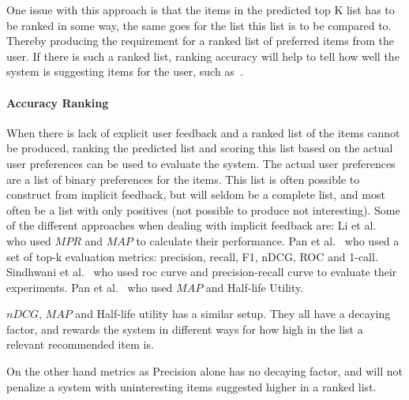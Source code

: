 	One issue with this approach is that the items in the predicted top K list has to be ranked in some way, the same goes for the list this list is to be compared to.
	Thereby producing the requirement for a ranked list of preferred items from the user.
	If there is such a ranked list, ranking accuracy will help to tell how well the system is suggesting items for the user, such as~\cite{Yilmaz:2008:NRC:1390334.1390435}.


\paragraph{Accuracy Ranking} %
	\label{par:usage_prediction}
	When there is lack of explicit user feedback and a ranked list of the items cannot be produced, ranking the predicted list and scoring this list based on the actual user preferences can be used to evaluate the system.
	The actual user preferences are a list of binary preferences for the items.
	This list is often possible to construct from implicit feedback, but will seldom be a complete list, and most often be a list with only positives (not possible to produce not interesting).
	Some of the different approaches when dealing with implicit feedback are:
	Li et al.~\cite{deLace2010} who used $MPR$ and $MAP$ to calculate their performance.
	Pan et al.~\cite{Pan:2013:GGP:2540128.2540516} who used a set of top-k evaluation metrics: precision, recall, F1, nDCG, ROC and 1-call.
	Sindhwani et al.~\cite{Sindhwani:2010:OMC:1933307.1934641} who used roc curve and precision-recall curve to evaluate their experiments.
	Pan et al.~\cite{pan2008} who used $MAP$ and Half-life Utility.

	$nDCG$, $MAP$ and Half-life utility has a similar setup.
	They all have a decaying factor, and rewards the system in different ways for how high in the list a relevant recommended item is.

	On the other hand metrics as Precision alone has no decaying factor, and will not penalize a system with uninteresting items suggested higher in a ranked list.



